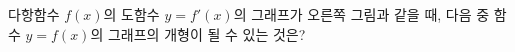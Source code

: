 \noindent\begin{minipage}[t]{0.58\linewidth}\vspace{0pt}\raggedright 다항함수 $f(x)$의 도함수 $y=f'(x)$의 그래프가 오른쪽 그림과 같을 때, 다음 중 함수 $y=f(x)$의 그래프의 개형이 될 수 있는 것은?\end{minipage}\hfill\begin{minipage}[t]{0.4\linewidth}\vspace{0pt}\centering \resizebox{\ifdim\width>\linewidth\linewidth\else\width\fi}{!}{}\end{minipage}\par
\begin{choicesii}{}{}{}{}{}\end{choicesii}
